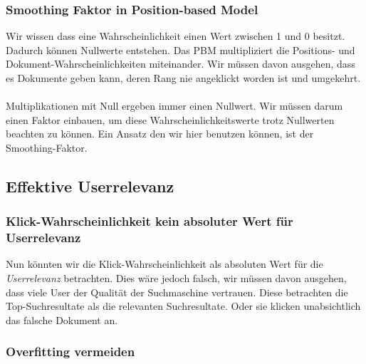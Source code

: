 \subsubsection{Smoothing Faktor in Position-based Model}
\label{sec:Einfuehrung:Methodik:SucheEinbinden:SmoothingPBM}

Wir wissen dass eine Wahrscheinlichkeit einen Wert zwischen 1 und 0 besitzt. Dadurch können Nullwerte entstehen. Das PBM multipliziert die Positions- und Dokument-Wahrscheinlichkeiten miteinander. Wir müssen davon ausgehen, dass es Dokumente geben kann, deren Rang nie angeklickt worden ist und umgekehrt. 
\\
\\
Multiplikationen mit Null ergeben immer einen Nullwert. Wir müssen darum einen Faktor einbauen, um diese Wahrscheinlichkeitswerte trotz Nullwerten beachten zu können. Ein Ansatz den wir hier benutzen können, ist der Smoothing-Faktor.

\subsection{Effektive Userrelevanz}
\label{sec:Einfuehrung:Methodik:Userrelevanz}

\subsubsection{Klick-Wahrscheinlichkeit kein absoluter Wert für Userrelevanz}
\label{sec:Einfuehrung:Methodik:Userrelevanz:Relevanzfeedback}

Nun könnten wir die Klick-Wahrscheinlichkeit als absoluten Wert für die \textit{Userrelevanz} betrachten. Dies wäre jedoch falsch, wir müssen davon ausgehen, dass viele User der Qualität der Suchmaschine vertrauen. Diese betrachten die Top-Suchresultate als die relevanten Suchresultate. Oder sie klicken unabsichtlich das falsche Dokument an.

\subsubsection{Overfitting vermeiden}
\label{sec:Einfuehrung:Methodik:Userrelevanz:Overfitting}

